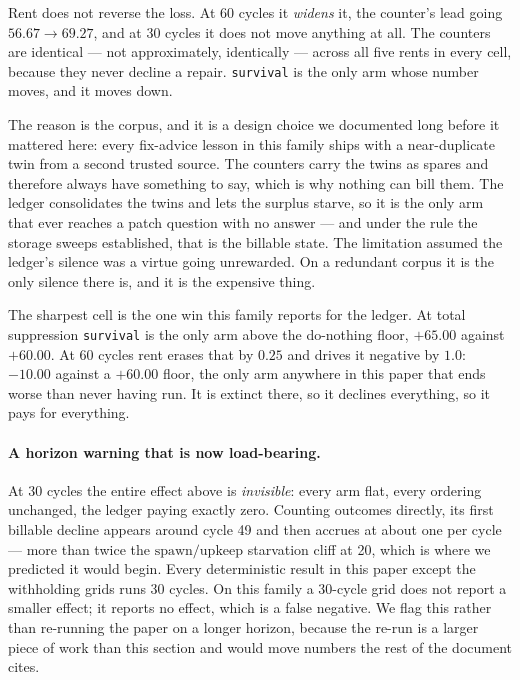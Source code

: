 Rent does not reverse the loss. At 60 cycles it \emph{widens} it, the
counter's lead going $56.67 \rightarrow 69.27$, and at 30 cycles it does
not move anything at all. The counters are identical --- not
approximately, identically --- across all five rents in every cell,
because they never decline a repair. \texttt{survival} is the only arm
whose number moves, and it moves down.

The reason is the corpus, and it is a design choice we documented long
before it mattered here: every fix-advice lesson in this family ships
with a near-duplicate twin from a second trusted source. The counters
carry the twins as spares and therefore always have something to say,
which is why nothing can bill them. The ledger consolidates the twins
and lets the surplus starve, so it is the only arm that ever reaches a
patch question with no answer --- and under the rule the storage sweeps
established, that is the billable state. The limitation assumed the
ledger's silence was a virtue going unrewarded. On a redundant corpus it
is the only silence there is, and it is the expensive thing.

The sharpest cell is the one win this family reports for the ledger. At
total suppression \texttt{survival} is the only arm above the do-nothing
floor, $+65.00$ against $+60.00$. At 60 cycles rent erases that by
$0.25$ and drives it negative by $1.0$: $-10.00$ against a $+60.00$
floor, the only arm anywhere in this paper that ends worse than never
having run. It is extinct there, so it declines everything, so it pays
for everything.

\paragraph{A horizon warning that is now load-bearing.} At 30 cycles the
entire effect above is \emph{invisible}: every arm flat, every ordering
unchanged, the ledger paying exactly zero. Counting outcomes directly,
its first billable decline appears around cycle 49 and then accrues at
about one per cycle --- more than twice the $\text{spawn}/\text{upkeep}$
starvation cliff at 20, which is where we predicted it would begin.
Every deterministic result in this paper except the withholding grids
runs 30 cycles. On this family a 30-cycle grid does not report a smaller
effect; it reports no effect, which is a false negative. We flag this
rather than re-running the paper on a longer horizon, because the
re-run is a larger piece of work than this section and would move
numbers the rest of the document cites.

